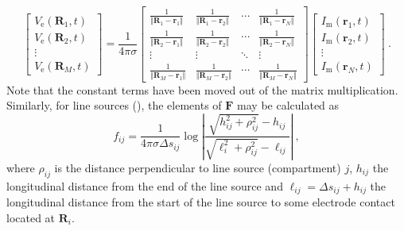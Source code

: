 %
\begin{equation}
\begin{bmatrix}
V_\text{e}(\mathbf{R}_1, t) \\
V_\text{e}(\mathbf{R}_2, t) \\
\vdots \\
V_\text{e}(\mathbf{R}_M, t)
\end{bmatrix}
= \frac{1}{4\pi\sigma}
\begin{bmatrix}
\frac{1}{\Vert\mathbf{R}_1 - \mathbf{r}_1\Vert} & \frac{1}{\Vert\mathbf{R}_1 - \mathbf{r}_2\Vert} & \cdots & \frac{1}{\Vert\mathbf{R}_1 - \mathbf{r}_N\Vert} \\
\frac{1}{\Vert\mathbf{R}_2 - \mathbf{r}_1\Vert} & \frac{1}{\Vert\mathbf{R}_2 - \mathbf{r}_2\Vert} & \cdots & \frac{1}{\Vert\mathbf{R}_2 - \mathbf{r}_N\Vert} \\
\vdots & \vdots & \ddots & \vdots \\
\frac{1}{\Vert\mathbf{R}_M - \mathbf{r}_1\Vert} & \frac{1}{\Vert\mathbf{R}_M - \mathbf{r}_2\Vert} & \cdots & \frac{1}{\Vert\mathbf{R}_M - \mathbf{r}_N\Vert}
\end{bmatrix}
\begin{bmatrix}
I_\text{m}(\mathbf{r}_1, t) \\
I_\text{m}(\mathbf{r}_2, t) \\
\vdots \\
I_\text{m}(\mathbf{r}_N, t)
\end{bmatrix} ~.
\end{equation}
%
Note that the constant terms have been moved out of the matrix multiplication.
Similarly, for line sources (), the elements of $\mathbf{F}$ may be calculated as
%
\begin{equation}
f_{ij} = \frac{1}{4\pi \sigma \Delta s_{ij}} \log \left| \frac{\sqrt{h_{ij}^2+\rho_{ij}^2}-h_{ij}}{\sqrt{\ell_i^2+\rho_{ij}^2}-\ell_{ij}} \right| ~,
\label{eq:LFPy:linesources}
\end{equation}
%
where $\rho_{ij}$ is the distance perpendicular to line source (compartment) $j$,
$h_{ij}$ the longitudinal distance from the end of the line source
and $\ell_{ij} = \Delta s_{ij} + h_{ij}$ the longitudinal distance from the start of the line source  to some electrode contact located at $\mathbf{R}_i$.

